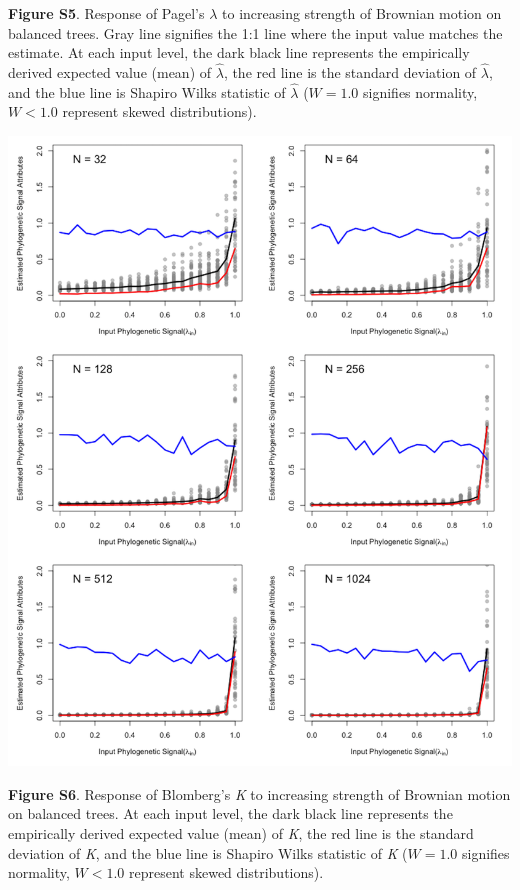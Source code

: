 \documentclass[
]{article}
\begin{document}
\textbf{Figure S5}. Response of Pagel's \(\lambda\) to increasing
strength of Brownian motion on balanced trees. Gray line signifies the
1:1 line where the input value matches the estimate. At each input
level, the dark black line represents the empirically derived expected
value (mean) of \(\hat\lambda\), the red line is the standard deviation
of \(\hat\lambda\), and the blue line is Shapiro Wilks statistic of
\(\hat\lambda\) (\(W=1.0\) signifies normality, \(W< 1.0\) represent
skewed distributions).

\includegraphics[width=0.95\linewidth]{fig.S6}

\textbf{Figure S6}. Response of Blomberg's \textit{K} to increasing
strength of Brownian motion on balanced trees. At each input level, the
dark black line represents the empirically derived expected value (mean)
of \textit{K}, the red line is the standard deviation of \textit{K}, and
the blue line is Shapiro Wilks statistic of \textit{K} (\(W=1.0\)
signifies normality, \(W< 1.0\) represent skewed distributions).
\end{document}
